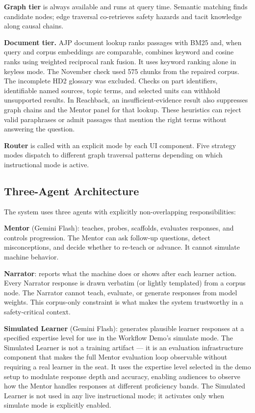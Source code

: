 \documentclass[10pt,letterpaper,twocolumn]{article}
\begin{document}
\textbf{Graph tier} is always available and runs at query time. Semantic matching finds candidate nodes; edge traversal co-retrieves safety hazards and tacit knowledge along causal chains.

\textbf{Document tier.} AJP document lookup ranks passages with BM25 and, when query and corpus embeddings are comparable, combines keyword and cosine ranks using weighted reciprocal rank fusion. It uses keyword ranking alone in keyless mode. The November check used 575 chunks from the repaired corpus. The incomplete HD2 glossary was excluded. Checks on part identifiers, identifiable named sources, topic terms, and selected units can withhold unsupported results. In Reachback, an insufficient-evidence result also suppresses graph chains and the Mentor panel for that lookup. These heuristics can reject valid paraphrases or admit passages that mention the right terms without answering the question.

\textbf{Router} is called with an explicit mode by each UI component. Five strategy modes dispatch to different graph traversal patterns depending on which instructional mode is active.

\subsection{Three-Agent Architecture}
\label{sec:three-agent}

The system uses three agents with explicitly non-overlapping responsibilities:

\textbf{Mentor} (Gemini Flash): teaches, probes, scaffolds, evaluates responses, and controls progression. The Mentor can ask follow-up questions, detect misconceptions, and decide whether to re-teach or advance. It cannot simulate machine behavior.

\textbf{Narrator}: reports what the machine does or shows after each learner action. Every Narrator response is drawn verbatim (or lightly templated) from a corpus node. The Narrator cannot teach, evaluate, or generate responses from model weights. This corpus-only constraint is what makes the system trustworthy in a safety-critical context.

\textbf{Simulated Learner} (Gemini Flash): generates plausible learner responses at a specified expertise level for use in the Workflow Demo's simulate mode. The Simulated Learner is not a training artifact --- it is an evaluation infrastructure component that makes the full Mentor evaluation loop observable without requiring a real learner in the seat. It uses the expertise level selected in the demo setup to modulate response depth and accuracy, enabling audiences to observe how the Mentor handles responses at different proficiency bands. The Simulated Learner is not used in any live instructional mode; it activates only when simulate mode is explicitly enabled.
\end{document}
